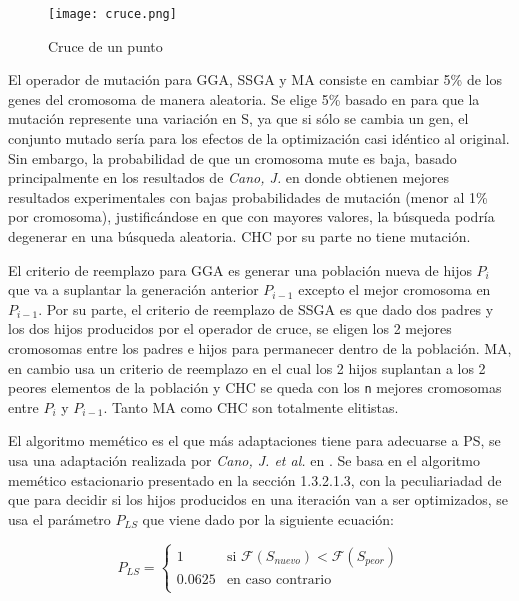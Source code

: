 \begin{figure}[h!]
\centering
\texttt{[image: cruce.png]}
\caption[Cruce de un punto]{Cruce de un punto}
\label{cruce}
\end{figure}

El operador de mutación para GGA, SSGA y MA consiste en cambiar 5\% de los genes del cromosoma de manera aleatoria. Se elige 5\%  basado en \cite{flores2014metaheuristics} para que la mutación represente una variación en S, ya que si sólo se cambia un gen, el conjunto mutado sería para los efectos de la optimización casi idéntico al original. Sin embargo, la probabilidad de que un cromosoma mute es baja, basado principalmente en los resultados de \emph{Cano, J.} en \cite{de2004reduccion} donde obtienen mejores resultados experimentales con bajas probabilidades de mutación (menor al 1\% por cromosoma), justificándose en que con mayores valores, la búsqueda podría degenerar en una búsqueda aleatoria. CHC por su parte no tiene mutación.

El criterio de reemplazo para GGA es generar una población nueva de hijos $P_i$ que va a suplantar la generación anterior $P_{i-1}$ excepto el mejor cromosoma en $P_{i-1}$. Por su parte, el criterio de reemplazo de SSGA es que dado dos padres y los dos hijos producidos por el operador de cruce, se eligen los 2 mejores cromosomas entre los padres e hijos para permanecer dentro de la población. MA, en cambio usa un criterio de reemplazo en el cual los 2 hijos suplantan a los 2 peores elementos de la población y CHC se queda con los \texttt{n} mejores cromosomas entre $P_i$ y $P_{i-1}$. Tanto MA como CHC son totalmente elitistas.

El algoritmo memético es el que más adaptaciones tiene para adecuarse a PS, se usa una adaptación realizada por \emph{Cano, J. et al.} en \cite{garcia2008memetic}. Se basa en el algoritmo memético estacionario presentado en la sección 1.3.2.1.3, con la peculiariadad de que para decidir si los hijos producidos en una iteración van a ser optimizados, se usa el parámetro $P_{LS}$ que viene dado por la siguiente ecuación:

\begin{equation}
P_{LS}=
\begin{cases}
1 & \text{si } \mathcal{F}(S_{nuevo}) < \mathcal{F}(S_{peor})\\
0.0625 & \text{en caso contrario}\\
\end{cases}
\end{equation}

